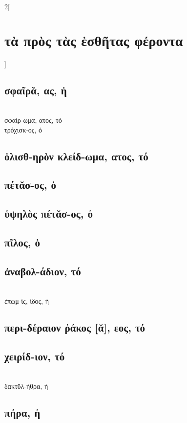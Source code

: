 \documentclass{book}
\begin{document}
\begin{multicols}{2}[\section{τὰ πρὸς τὰς ἑσθῆτας φέροντα}]
\subsection{σφαῖρᾰ, ας, ἡ}   ~\\
σφαίρ-ωμα, ατος, τό                 ~\\
τρόχισκ-ος, ὁ 
\subsection{ὀλισθ-ηρὸν κλείδ-ωμα, ατος, τό} 
\subsection{πέτᾰσ-ος, ὁ}
\subsection{ὑψηλὸς πέτᾰσ-ος, ὁ}
\subsection{πῖλος, ὁ}
\subsection{ἀναβολ-άδιον, τό}  ~\\
{ἐπωμ-ίς, ίδος, ἡ} 
\subsection{περι-δέραιον ῥάκος [ᾰ], εος, τό}
\subsection{χειρίδ-ιον, τό}  ~\\
δακτῠλ-ήθρα, ἡ
\subsection{πήρα, ἡ}          

\end{multicols}
\end{document}
